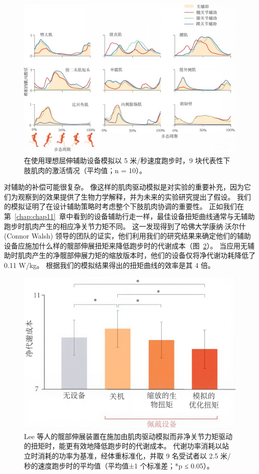 \begin{figure}[!htb]
	\centering
	\includegraphics[width=1.0\linewidth]{chap12/12_13}
	\caption{在使用理想屈伸辅助设备模拟以 5 米/秒速度跑步时，9 块代表性下肢肌肉的激活情况（平均值；n = 10）\cite{uchida2016simulating}。 \label{fig:12_13}}
\end{figure}


对辅助的补偿可能很复杂。
像这样的肌肉驱动模拟是对实验的重要补充，因为它们为观察到的效果提供了生物力学解释，并为未来的实验研究提出了假设。
我们的模拟证明了在设计辅助策略时考虑整个下肢肌肉协调的重要性。
正如我们在第~\ref{chap:chap11}~章中看到的设备辅助行走一样，最佳设备扭矩曲线通常与无辅助跑步时肌肉产生的相应净关节力矩不同。
这一发现得到了哈佛大学康纳$\cdot$沃尔什 (Connor Walsh) 领导的团队的证实，他们利用我们的研究结果来确定他们的辅助设备应施加什么样的髋部伸展扭矩来降低跑步时的代谢成本（图~\ref{fig:12_14}）。
当应用无辅助时肌肉产生的净髋部伸展力矩的缩放版本时，他们的设备仅将净代谢功耗降低了 0.11 W/kg。
根据我们的模拟结果得出的扭矩曲线的效率是其 4 倍。


\begin{figure}[!htb]
	\centering
	\includegraphics[width=0.8\linewidth]{chap12/12_14}
	\caption{Lee 等人的髋部伸展装置在施加由肌肉驱动模拟而非净关节力矩驱动的扭矩时，能更有效地降低跑步时的代谢成本。
		代谢功率消耗以站立时消耗的功率为基准，经体重标准化，并取 9 名受试者以 2.5 米/秒的速度跑步时的平均值（平均值±1 个标准差；*p ≤ 0.05）\cite{lee2017reducing}。 \label{fig:12_14}}
\end{figure}


